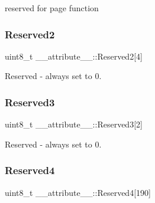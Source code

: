 reserved for page function 

\hypertarget{struct____attribute_____a534ebf7a2bdad17747cfc9cb6cc50c5c}{}\label{struct____attribute_____a534ebf7a2bdad17747cfc9cb6cc50c5c} 
\subsubsection{\texorpdfstring{Reserved2}{Reserved2}}
{\footnotesize\ttfamily uint8\+\_\+t \+\_\+\+\_\+attribute\+\_\+\+\_\+\+::\+Reserved2\mbox{[}4\mbox{]}}



Reserved -\/ always set to 0. 

\hypertarget{struct____attribute_____a9336499af9094522dbe1bfd4d43934a1}{}\label{struct____attribute_____a9336499af9094522dbe1bfd4d43934a1} 
\subsubsection{\texorpdfstring{Reserved3}{Reserved3}}
{\footnotesize\ttfamily uint8\+\_\+t \+\_\+\+\_\+attribute\+\_\+\+\_\+\+::\+Reserved3\mbox{[}2\mbox{]}}



Reserved -\/ always set to 0. 

\hypertarget{struct____attribute_____ab859fb715f83f005dfa2f13d8b0e4ff0}{}\label{struct____attribute_____ab859fb715f83f005dfa2f13d8b0e4ff0} 
\subsubsection{\texorpdfstring{Reserved4}{Reserved4}}
{\footnotesize\ttfamily uint8\+\_\+t \+\_\+\+\_\+attribute\+\_\+\+\_\+\+::\+Reserved4\mbox{[}190\mbox{]}}

\hypertarget{struct____attribute_____a61fb6dc07b7edbd8a3a94745336f256c}{}\label{struct____attribute_____a61fb6dc07b7edbd8a3a94745336f256c} 
